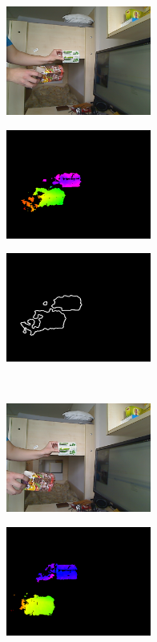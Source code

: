 \begin{figure}[b!]
  \begin{subfigure}[b]{.32\linewidth}
	\centering
	\includegraphics[width=135pt]{figures/scene2/left_130.png}
  \end{subfigure}
\begin{subfigure}[b]{.32\linewidth}
	\centering
	\includegraphics[width=135pt]{figures/scene2/vis_130.png}
  \end{subfigure}
\begin{subfigure}[b]{.32\linewidth}
	\centering
	\includegraphics[width=135pt]{figures/scene2/ctr_130.png}
  \end{subfigure}\\\vspace{5pt}
  \begin{subfigure}[b]{.32\linewidth}
	\centering
	\includegraphics[width=135pt]{figures/scene2/left_215.png}
  \end{subfigure}
\begin{subfigure}[b]{.32\linewidth}
	\centering
	\includegraphics[width=135pt]{figures/scene2/vis_215.png}

\end{subfigure}
\end{figure}
